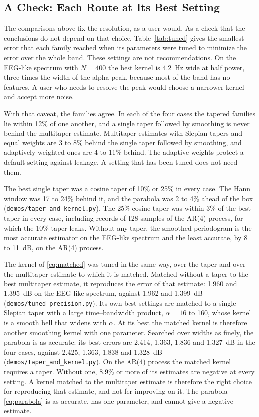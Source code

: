 \documentclass[10pt,twocolumn]{article}
\begin{document}
\subsection{A Check: Each Route at Its Best Setting}
\label{sec:tuned}
The comparisons above fix the resolution, as a user would. As a check that the conclusions do not depend on that choice, Table~\ref{tab:tuned} gives the smallest error that each family reached when its parameters were tuned to minimize the error over the whole band. These settings are not recommendations. On the EEG-like spectrum with $N=400$ the best kernel is 4.2~Hz wide at half power, three times the width of the alpha peak, because most of the band has no features. A user who needs to resolve the peak would choose a narrower kernel and accept more noise.

With that caveat, the families agree. In each of the four cases the tapered families lie within 12\% of one another, and a single taper followed by smoothing is never behind the multitaper estimate. Multitaper estimates with Slepian tapers and equal weights are 3 to 8\% behind the single taper followed by smoothing, and adaptively weighted ones are 4 to 11\% behind. The adaptive weights protect a default setting against leakage. A setting that has been tuned does not need them.

The best single taper was a cosine taper of 10\% or 25\% in every case. The Hann window was 17 to 24\% behind it, and the parabola was 2 to 4\% ahead of the box (\texttt{demos/taper\_and\_kernel.py}). The 25\% cosine taper was within 3\% of the best taper in every case, including records of 128 samples of the AR(4) process, for which the 10\% taper leaks. Without any taper, the smoothed periodogram is the most accurate estimator on the EEG-like spectrum and the least accurate, by 8 to 11~dB, on the AR(4) process.

The kernel of \eqref{eq:matched} was tuned in the same way, over the taper and over the multitaper estimate to which it is matched. Matched without a taper to the best multitaper estimate, it reproduces the error of that estimate: 1.960 and 1.395~dB on the EEG-like spectrum, against 1.962 and 1.399~dB (\texttt{demos/tuned\_precision.py}). Its own best settings are matched to a single Slepian taper with a large time--bandwidth product, $\alpha=16$ to 160, whose kernel is a smooth bell that widens with $\alpha$. At its best the matched kernel is therefore another smoothing kernel with one parameter. Searched over widths as finely, the parabola is as accurate: its best errors are 2.414, 1.363, 1.836 and 1.327~dB in the four cases, against 2.425, 1.363, 1.838 and 1.328~dB (\texttt{demos/taper\_and\_kernel.py}). On the AR(4) process the matched kernel requires a taper. Without one, 8.9\% or more of its estimates are negative at every setting. A kernel matched to the multitaper estimate is therefore the right choice for reproducing that estimate, and not for improving on it. The parabola \eqref{eq:parabola} is as accurate, has one parameter, and cannot give a negative estimate.
\end{document}
